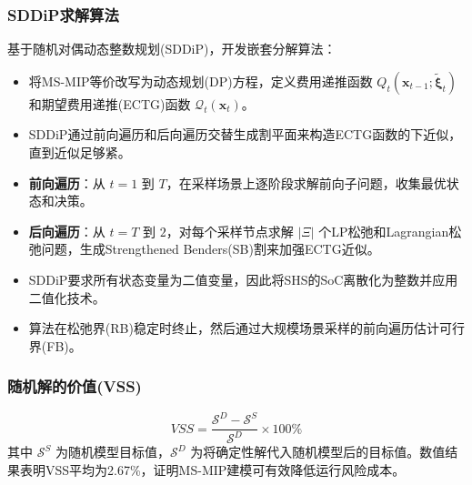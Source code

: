 \documentclass[11pt]{ctexart}
\begin{document}
\subsubsection{SDDiP求解算法}

基于随机对偶动态整数规划(SDDiP)，开发嵌套分解算法：
\begin{itemize}[leftmargin=2em]
    \item 将MS-MIP等价改写为动态规划(DP)方程，定义费用递推函数 $Q_t(\boldsymbol{x}_{t-1}; \tilde{\boldsymbol{\xi}}_t)$ 和期望费用递推(ECTG)函数 $\mathcal{Q}_t(\boldsymbol{x}_t)$。
    \item SDDiP通过前向遍历和后向遍历交替生成割平面来构造ECTG函数的下近似，直到近似足够紧。
    \item \textbf{前向遍历}：从 $t=1$ 到 $T$，在采样场景上逐阶段求解前向子问题，收集最优状态和决策。
    \item \textbf{后向遍历}：从 $t=T$ 到 $2$，对每个采样节点求解 $|\Xi|$ 个LP松弛和Lagrangian松弛问题，生成Strengthened Benders(SB)割来加强ECTG近似。
    \item SDDiP要求所有状态变量为二值变量，因此将SHS的SoC离散化为整数并应用二值化技术。
    \item 算法在松弛界(RB)稳定时终止，然后通过大规模场景采样的前向遍历估计可行界(FB)。
\end{itemize}

\subsubsection{随机解的价值(VSS)}
\begin{equation}
    VSS = \frac{\mathcal{S}^D - \mathcal{S}^S}{\mathcal{S}^D} \times 100\%
\end{equation}
其中 $\mathcal{S}^S$ 为随机模型目标值，$\mathcal{S}^D$ 为将确定性解代入随机模型后的目标值。数值结果表明VSS平均为2.67\%，证明MS-MIP建模可有效降低运行风险成本。
\end{document}
